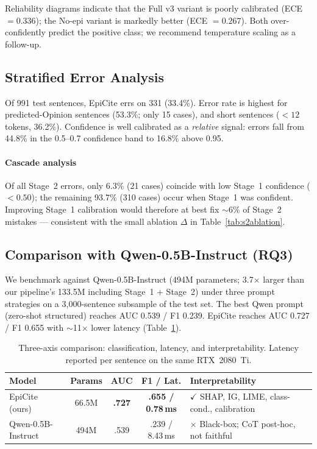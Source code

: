 \documentclass[conference]{IEEEtran}
\begin{document}
Reliability diagrams indicate that the Full v3 variant is poorly calibrated
(ECE $= 0.336$); the No-epi variant is markedly better (ECE
$= 0.267$). Both over-confidently predict the positive class; we
recommend temperature scaling \cite{guo2017calibration} as a follow-up.

\subsection{Stratified Error Analysis}

Of 991 test sentences, EpiCite errs on 331 (33.4\%). Error rate is
highest for predicted-Opinion sentences (53.3\%; only 15 cases), and
short sentences ($<\!12$ tokens, 36.2\%). Confidence is well
calibrated as a \emph{relative} signal: errors fall from 44.8\% in the
0.5--0.7 confidence band to 16.8\% above 0.95.

\paragraph{Cascade analysis}
Of all Stage~2 errors, only 6.3\% (21 cases) coincide with low Stage~1
confidence ($<0.50$); the remaining 93.7\% (310 cases) occur when
Stage~1 was confident. Improving Stage~1 calibration would therefore at
best fix $\sim$6\% of Stage~2 mistakes --- consistent with the small
ablation $\Delta$ in Table~\ref{tab:s2ablation}.

\subsection{Comparison with Qwen-0.5B-Instruct (RQ3)}
\label{sec:qwen}

We benchmark against Qwen-0.5B-Instruct (494M parameters; 3.7$\times$
larger than our pipeline's 133.5M including Stage~1 + Stage~2) under three
prompt strategies on a 3{,}000-sentence subsample of the test set.
The best Qwen prompt (zero-shot structured) reaches AUC 0.539 / F1
0.239. EpiCite reaches AUC 0.727 / F1 0.655 with $\sim$11$\times$
lower latency (Table~\ref{tab:qwen}).

\begin{table}[t]
\centering
\caption{Three-axis comparison: classification, latency, and
interpretability. Latency reported per sentence on the same RTX~2080~Ti.}
\label{tab:qwen}
\footnotesize
\setlength{\tabcolsep}{2.5pt}
\begin{tabular}{lcccp{2.3cm}}
\toprule
\textbf{Model} & \textbf{Params} & \textbf{AUC} & \textbf{F1 / Lat.} & \textbf{Interpretability} \\
\midrule
EpiCite (ours)     & 66.5M & \textbf{.727} & \textbf{.655 / 0.78\,ms} &
   $\checkmark$ SHAP, IG, LIME, class-cond., calibration \\
Qwen-0.5B-Instruct & 494M  & .539 & .239 / 8.43\,ms &
   $\times$ Black-box; CoT post-hoc, not faithful \\
\bottomrule
\end{tabular}
\end{table}
\end{document}
